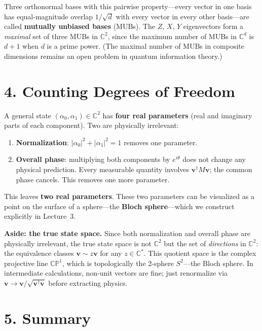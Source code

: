 \documentclass[12pt,a4paper]{article}
\begin{document}
Three orthonormal bases with this pairwise property---every vector in one basis has equal-magnitude overlap $1/\sqrt{d}$ with every vector in every other basis---are called \textbf{mutually unbiased bases} (MUBs).  The $Z$, $X$, $Y$ eigenvectors form a \emph{maximal} set of three MUBs in $\mathbb{C}^2$, since the maximum number of MUBs in $\mathbb{C}^d$ is $d+1$ when $d$ is a prime power.  (The maximal number of MUBs in composite dimensions remains an open problem in quantum information theory.)

\section{4. Counting Degrees of Freedom}

A general state $(\alpha_0,\alpha_1)\in\mathbb{C}^2$ has \textbf{four real parameters} (real and imaginary parts of each component).  Two are physically irrelevant:
\begin{enumerate}[nosep]
    \item \textbf{Normalization}: $|\alpha_0|^2+|\alpha_1|^2=1$ removes one parameter.
    \item \textbf{Overall phase}: multiplying both components by $e^{i\theta}$ does not change any physical prediction.  Every measurable quantity involves $\mathbf{v}^\dagger M\mathbf{v}$; the common phase cancels.  This removes one more parameter.
\end{enumerate}
This leaves \textbf{two real parameters}.  These two parameters can be visualized as a point on the surface of a sphere---the \textbf{Bloch sphere}---which we construct explicitly in Lecture~3.

\medskip
\noindent\textbf{Aside: the true state space.}  Since both normalization and overall phase are physically irrelevant, the true state space is not $\mathbb{C}^2$ but the set of \emph{directions} in $\mathbb{C}^2$: the equivalence classes $\mathbf{v}\sim z\mathbf{v}$ for any $z\in\mathbb{C}^*$.  This quotient space is the complex projective line $\mathbb{CP}^1$, which is topologically the 2-sphere $S^2$---the Bloch sphere.  In intermediate calculations, non-unit vectors are fine; just renormalize via $\mathbf{v}\to\mathbf{v}/\sqrt{\mathbf{v}^\dagger\mathbf{v}}$ before extracting physics.

\section{5. Summary}
\end{document}
